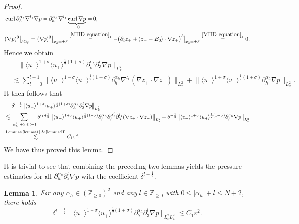 \documentclass[10pt,reqno]{amsart}
\numberwithin{equation}{section}
\newtheorem{lemma}[theorem]{Lemma}
\begin{document}
\begin{proof}
\begin{align*}
&\operatorname{curl}\partial_h^{\alpha_h}\nabla^{l_1} \nabla p=\partial_h^{\alpha_h}\nabla^{l_1}\underbrace{\operatorname{curl}\nabla p}_{=0}=0,\\
&(\nabla p)^3\big|_{\partial\Omega_{\delta}}=(\nabla p)^3\big|_{x_3=\pm\delta}\stackrel{\eqref{MHD equation}_1}{=}-\big(\partial_tz_++(z_--B_0)\cdot \nabla z_+\big)^3\big|_{x_3=\pm\delta}\stackrel{\eqref{MHD equation}_4}{=}0.
\end{align*}
Hence we obtain
\begin{align*}
	&\ \ \ \ \big\|\langle u_-\rangle^{1+\sigma}\langle u_+\rangle^{\frac{1}{2}(1+\sigma)}\partial_{h}^{\alpha_h}\partial_3^l \nabla p\big\|_{L^2_x}\\
	&\lesssim\sum_{l_1=0}^{l-1} \big\|\langle u_-\rangle^{1+\sigma}\langle u_+\rangle^{\frac{1}{2}(1+\sigma)}\partial_h^{\alpha_h}\nabla^{l_1} (\nabla z_+\cdot \nabla z_-)\big\|_{L^2_x}+\big\|\langle u_-\rangle^{1+\sigma}\langle u_+\rangle^{\frac{1}{2}(1+\sigma)}\partial_h^{\alpha_h}\nabla p\big\|_{L^2_x}.
\end{align*}
It then follows that 
		\begin{align*}
			&\ \ \ \ \delta^{l-\frac{1}{2}}\big\|\langle u_-\rangle^{1+\sigma}\langle u_+\rangle^{\frac{1}{2}(1+\sigma)}\partial_{h}^{\alpha_h}\partial_3^l \nabla p\big\|_{L^2_x}\\
			&\lesssim\sum_{|\alpha_h'|+l_1\leqslant l-1}\delta^{l_1+\frac{1}{2}} \big\|\langle u_-\rangle^{1+\sigma}\langle u_+\rangle^{\frac{1}{2}(1+\sigma)}\partial_h^{\alpha_h}\partial_h^{\alpha_h'}\partial_3^{l_1} (\nabla z_+\cdot \nabla z_-)\big\|_{L^2_x}+\delta^{-\frac{1}{2}}\big\|\langle u_-\rangle^{1+\sigma}\langle u_+\rangle^{\frac{1}{2}(1+\sigma)}\partial_h^{\alpha_h}\nabla p\big\|_{L^2_x}\\
			&\stackrel{\text{Lemmas  \ref{lemma1} \&  \ref{lemma:H}}}{\lesssim}C_1\varepsilon^2.
	\end{align*}
We have thus proved this lemma. 
\end{proof}

It is trivial to see that  combining the preceding two lemmas yields the pressure estimates for all $\partial_{h}^{\alpha_h}\partial_3^l \nabla p$  with the coefficient $\delta^{l-\frac{1}{2}}$.
\begin{lemma}\label{lemma:HH'}
	For any $\alpha_h\in(\mathbb{Z}_{\geqslant 0})^2$ and any $l\in\mathbb{Z}_{\geqslant 0}$ with
	$0\leqslant
	|\alpha_h|+l\leqslant N+2$, there holds 
	\begin{equation*}
		\delta^{l-\frac{1}{2}}\big\|\langle u_-\rangle^{1+\sigma}\langle u_+\rangle^{\frac{1}{2}(1+\sigma)}\partial_{h}^{\alpha_h}\partial_3^l \nabla p\big\|_{L^2_tL^2_x}
		\lesssim C_1\varepsilon^2.
	\end{equation*}
\end{lemma}
\end{document}
